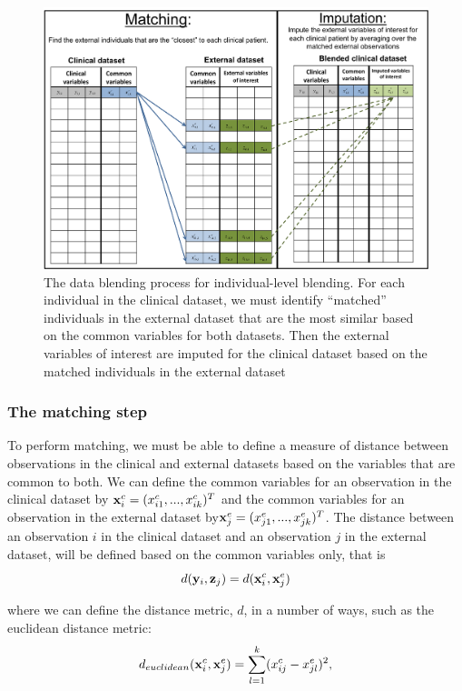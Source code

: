 \documentclass{article}
\begin{document}
\begin{figure}[H]
\begin{center}
\includegraphics[scale=0.45]{blending.png}
\end{center}
\caption{The data blending process for individual-level blending. For each individual in the clinical dataset, we must identify ``matched'' individuals in the external dataset that are the most similar based on the common variables for both datasets. Then the external variables of interest are imputed for the clinical dataset based on the matched individuals in the external dataset}
\label{fig:blend}
\end{figure}

\subsubsection{The matching step}

To perform matching, we must be able to define a measure of distance between observations in the clinical and external datasets based on the variables that are common to both. We can define the common variables for an observation in the clinical dataset by ${\bf x}_i^c = (x_{i1}^c, ..., x_{ik}^c)^T$ and the common variables for an observation in the external dataset by${\bf x}_j^e = (x_{j1}^e, ..., x_{jk}^e)^T$. The distance between an observation $i$ in the clinical dataset and an observation $j$ in the external dataset, will be defined based on the common variables only, that is
$$d({\bf y}_i, {\bf z}_j) = d({\bf x}_i^c, {\bf x}_j^e)$$

where we can define the distance metric, $d$, in a number of ways, such as the euclidean distance metric:
$$d_{euclidean}({\bf x}_i^c, {\bf x}_j^e) = \sum_{l=1}^k(x_{ij}^c - x_{jl}^e)^2,$$
\end{document}
